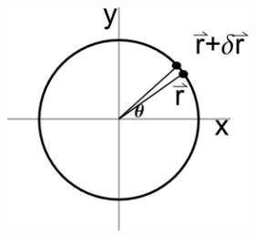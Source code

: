 \begin{problem}
\begin{subproblem}
    \includegraphics[width=7cm]{ink/week12/circularAcceleration}

    \vfill

  \end{subproblem}

\end{problem}


